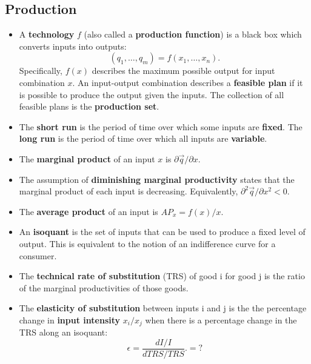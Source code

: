 \documentclass[a4paper]{article}
\begin{document}
\subsection{Production}
\begin{itemize}
    \item A \textbf{technology} $f$ (also called a \textbf{production function}) is a black box which converts inputs into outputs: $$(q_1, \hdots, q_m) = f(x_1, \hdots, x_n).$$ Specifically, $f(x)$ describes the maximum possible output for input combination $x$. An input-output combination describes a \textbf{feasible plan} if it is possible to produce the output given the inputs. The collection of all feasible plans is the \textbf{production set}.
    \item The \textbf{short run} is the period of time over which some inputs are \textbf{fixed}. The \textbf{long run} is the period of time over which all inputs are \textbf{variable}.
    \item The \textbf{marginal product} of an input $x$ is $\partial \vec{q}/\partial x$.
    \item The assumption of \textbf{diminishing marginal productivity} states that the marginal product of each input is decreasing. Equivalently, $\partial^2 \vec{q}/\partial x^2 < 0$.
    \item The \textbf{average product} of an input is $AP_x = f(x) / x$.
    \item An \textbf{isoquant} is the set of inputs that can be used to produce a fixed level of output. This is equivalent to the notion of an indifference curve for a consumer.
    \item The \textbf{technical rate of substitution} (TRS) of good i for good j is the ratio of the marginal productivities of those goods.
    \item The \textbf{elasticity of substitution} between inputs i and j is the the percentage change in \textbf{input intensity} $x_i/x_j$ when there is a percentage change in the TRS along an isoquant: $$\epsilon = \frac{dI/I}{dTRS/TRS}. = ?$$
\end{itemize}
\end{document}
